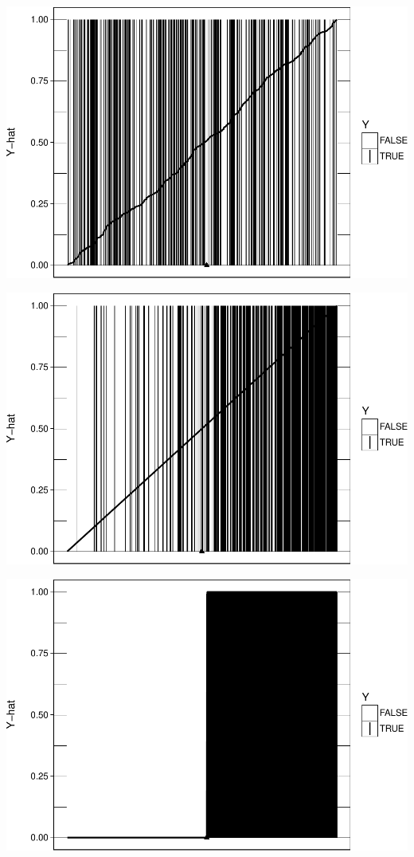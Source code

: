 \documentclass[12pt,twoside]{reedthesis}
\begin{document}
  \begin{center}\includegraphics{thesis_files/figure-latex/unnamed-chunk-3-1} \end{center}
  
  \begin{center}\includegraphics{thesis_files/figure-latex/unnamed-chunk-3-2} \end{center}
  
  \begin{center}\includegraphics{thesis_files/figure-latex/unnamed-chunk-3-3} \end{center}
  
\end{document}
